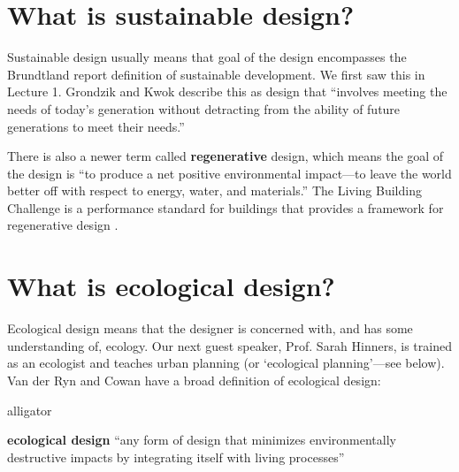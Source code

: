 \documentclass[10pt]{article}
\begin{document}
\section{What is sustainable design?}

{}

\medskip

Sustainable design usually means that goal of the design encompasses the Brundtland report \cite{bruntland} definition of sustainable development. We first saw this in Lecture 1. Grondzik and Kwok describe this as design that ``involves meeting the needs of today's generation
without detracting from the ability of future generations
to meet their needs.'' \cite{Grondzik2014-gt}

There is also a newer term called \textbf{regenerative} design, which means the goal of the design is ``to produce a net positive environmental
impact---to leave the world better off with respect to
energy, water, and materials.'' \cite{Grondzik2014-gt} The Living Building Challenge is a performance standard for buildings that provides a framework for regenerative design \cite{noauthor_2016-ep}.



\section{What is ecological design?}

{}

\medskip

Ecological design means that the designer is concerned with, and has some understanding of, ecology. Our next guest speaker, Prof. Sarah Hinners, is trained as an ecologist and teaches urban planning (or `ecological planning'---see below).  Van der Ryn and Cowan have a broad definition of ecological design:
\begin{labeling}{alligator}
\item [\textbf{ecological design}] ``any form of design that minimizes environmentally destructive impacts by integrating itself with living processes'' \cite{Van_der_Ryn2013-by}
\end{labeling}
\end{document}
